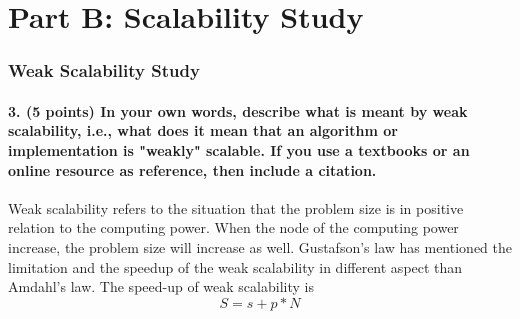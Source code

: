 \documentclass[pstricks,border=14pt,14pt]{article}
\begin{document}
\part*{Part B: Scalability Study}
\section*{Weak Scalability Study}
\subsection*{3. (5 points) In your own words, describe what is meant by weak scalability, i.e., what does it mean that an algorithm or implementation is "weakly" scalable. If you use a textbooks or an online resource as reference, then include a citation.}
Weak scalability refers to the situation that the problem size is in positive relation to the computing power. When the node of the computing power increase, the problem size will increase as well. Gustafson's law has mentioned the limitation and the speedup of the weak scalability in different aspect than Amdahl's law. The speed-up of weak scalability is
\begin{equation}
    S = s + p * N 
\end{equation}
\end{document}
